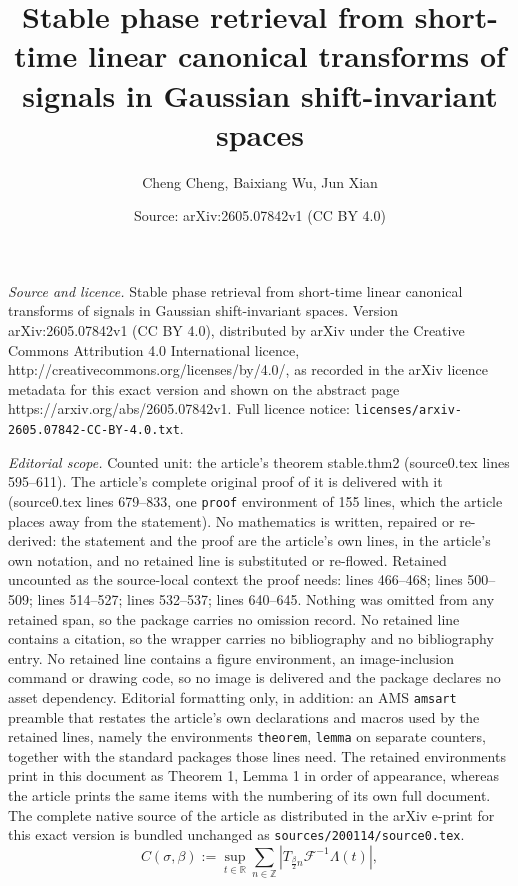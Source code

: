 \documentclass[10pt,a4paper]{amsart}
\title{Stable phase retrieval from short-time linear canonical transforms of signals in Gaussian shift-invariant spaces}
\author{Cheng Cheng, Baixiang Wu, Jun Xian}
\date{Source: arXiv:2605.07842v1 (CC BY 4.0)}
\newcommand{\R}{\mathbb{R}}
\newcommand{\Z}{\mathbb{Z}}
\begin{document}
\maketitle

\noindent\emph{Source and licence.} Stable phase retrieval from short-time linear canonical transforms of signals in Gaussian shift-invariant spaces. Version arXiv:2605.07842v1 (CC BY 4.0), distributed by arXiv under the Creative Commons Attribution 4.0 International licence, http://creativecommons.org/licenses/by/4.0/, as recorded in the arXiv licence metadata for this exact version and shown on the abstract page https://arxiv.org/abs/2605.07842v1. Full licence notice: \texttt{licenses/arxiv-2605.07842-CC-BY-4.0.txt}.\par\smallskip

\noindent\textit{Editorial scope.} Counted unit: the article's theorem stable.thm2 (source0.tex lines 595--611). The article's complete original proof of it is delivered with it (source0.tex lines 679--833, one \texttt{proof} environment of 155 lines, which the article places away from the statement). No mathematics is written, repaired or re-derived: the statement and the proof are the article's own lines, in the article's own notation, and no retained line is substituted or re-flowed.  Retained uncounted as the source-local context the proof needs: lines 466--468; lines 500--509; lines 514--527; lines 532--537; lines 640--645.  Nothing was omitted from any retained span, so the package carries no omission record.  No retained line contains a citation, so the wrapper carries no bibliography and no bibliography entry.  No retained line contains a figure environment, an image-inclusion command or drawing code, so no image is delivered and the package declares no asset dependency.  Editorial formatting only, in addition: an AMS \texttt{amsart} preamble that restates the article's own declarations and macros used by the retained lines, namely the environments \texttt{theorem}, \texttt{lemma} on separate counters, together with the standard packages those lines need.  The retained environments print in this document as Theorem 1, Lemma 1 in order of appearance, whereas the article prints the same items with the numbering of its own full document.  The complete native source of the article as distributed in the arXiv e-print for this exact version is bundled unchanged as \texttt{sources/200114/source0.tex}.
\begin{equation}\label{Csigma.def}
    C(\sigma,\beta):=  \sup_{t\in\R}\sum_{n\in\Z}     \left|T_{\frac{\beta}{2}n}\mathcal{F}^{-1}\Lambda(t)\right|,
\end{equation}
\end{document}
